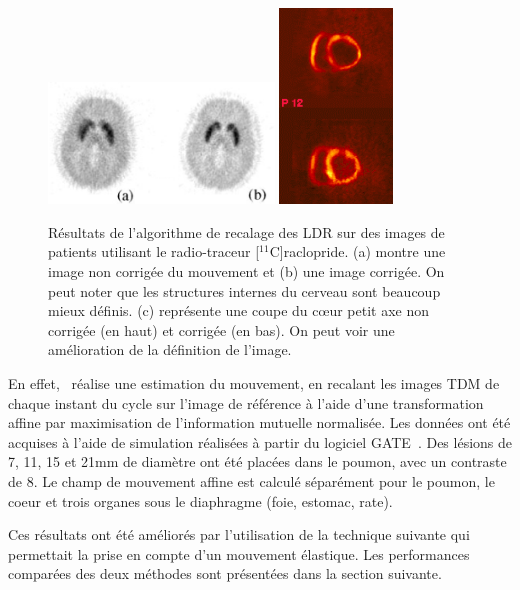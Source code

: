 \begin{figure}[h!]
	\begin{center}
		\includegraphics[width=6cm]{images/bloomfield2003design} \includegraphics[width=3cm]{images/livieratos2005rigid}
	\end{center}
	\caption{Résultats de l'algorithme de recalage des LDR sur des images de patients utilisant le radio-traceur [$^{11}$C]raclopride. (a) montre une image non corrigée du mouvement et (b) une image corrigée. On peut noter que les structures internes du cerveau sont beaucoup mieux définis. (c) représente une coupe du c\oe{}ur petit axe non corrigée (en haut) et corrigée (en bas). On peut voir une amélioration de la définition de l'image.} 
	\label{fig:ameliorationLOR}
\end{figure}
 

En effet,~\cite{lamare2007respiratory} réalise une estimation du mouvement, en recalant les images TDM de chaque instant du cycle sur l'image de référence à l'aide d'une transformation affine par maximisation de l'information mutuelle normalisée. Les données ont été acquises à l'aide de simulation réalisées à partir du logiciel GATE~\cite{jan2004gate}. Des lésions de 7, 11, 15 et 21mm de diamètre ont été placées dans le poumon, avec un contraste de 8. Le champ de mouvement affine est calculé séparément pour le poumon, le coeur et trois organes sous le diaphragme (foie, estomac, rate).

Ces résultats ont été améliorés par l'utilisation de la technique suivante qui permettait la prise en compte d'un mouvement élastique. Les performances comparées des deux méthodes sont présentées dans la section suivante.


